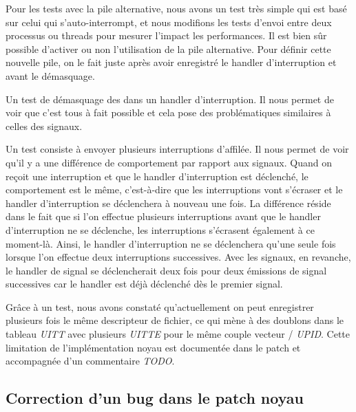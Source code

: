 Pour les tests avec la pile alternative, nous avons un test très simple qui est basé sur celui qui s'auto-interrompt, et nous modifions les tests d'envoi entre deux processus ou threads pour mesurer l'impact les performances.
Il est bien sûr possible d'activer ou non l'utilisation de la pile alternative.
Pour définir cette nouvelle pile, on le fait juste après avoir enregistré le handler d'interruption et avant le démasquage.

Un test de démasquage des \uintr{} dans un handler d'interruption.
Il nous permet de voir que c'est tous à fait possible et cela pose des problématiques similaires à celles des signaux.

Un test consiste à envoyer plusieurs interruptions d'affilée.
Il nous permet de voir qu'il y a une différence de comportement par rapport aux signaux.
Quand on reçoit une interruption et que le handler d'interruption est déclenché, le comportement est le même,
c'est-à-dire que les interruptions vont s'écraser et le handler d'interruption se déclenchera à nouveau une fois.
La différence réside dans le fait que si l'on effectue plusieurs interruptions avant que le handler d'interruption ne se déclenche,
les interruptions s'écrasent également à ce moment-là.
Ainsi, le handler d'interruption ne se déclenchera qu'une seule fois lorsque l'on effectue deux interruptions successives.
Avec les signaux, en revanche, le handler de signal se déclencherait deux fois pour deux émissions de signal successives car le handler est déjà déclenché dès le premier signal.

Grâce à un test, nous avons constaté qu'actuellement on peut enregistrer plusieurs fois le même descripteur de fichier,
ce qui mène à des doublons dans le tableau \emph{UITT} avec plusieurs \emph{UITTE} pour le même couple vecteur / \emph{UPID}.
Cette limitation de l'implémentation noyau est documentée dans le patch et accompagnée d'un commentaire \emph{TODO}.

\subsection{Correction d'un bug dans le patch noyau}

